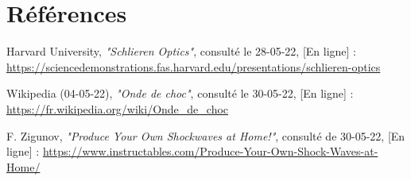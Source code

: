 \section*{Références}
\parindent0pt
\begin{enumerate}[label = {[\arabic*]}]
	\item Harvard University, \textit{"Schlieren Optics"}, consulté le 28-05-22, [En ligne] : \small\url{https://sciencedemonstrations.fas.harvard.edu/presentations/schlieren-optics}
	\label{ref:harvardedu}
	\item Wikipedia (04-05-22), \textit{"Onde de choc"}, consulté le 30-05-22, [En ligne] : \small\url{https://fr.wikipedia.org/wiki/Onde_de_choc}
	\label{ref:wiki_choc}
	\item F. Zigunov, \textit{"Produce Your Own Shockwaves at Home!"}, consulté de 30-05-22, [En ligne] : \small\url{https://www.instructables.com/Produce-Your-Own-Shock-Waves-at-Home/}
	\label{ref:zigunov}
\end{enumerate}